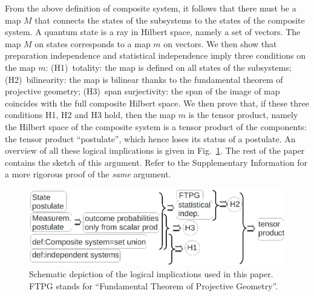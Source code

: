\documentclass[aps,prl,amsmath,amssymb,twocolumn,nofootinbib]{revtex4}
\theoremstyle{plain}
\theoremstyle{definition}
\theoremstyle{remark}
\begin{document}
	From the above definition of composite system, it follows that there
	must be a map $M$ that connects the states of the subsystems to the
	states of the composite system. A quantum state is a ray in Hilbert
	space, namely a set of vectors. The map $M$ on states corresponds to a
	map $m$ on vectors. We then show that preparation independence and
	statistical independence imply three conditions on the map $m$:
	(H1)~totality: the map is defined on all states of the subsystems;
	(H2)~bilinearity: the map is bilinear thanks to the fundamental
	theorem of projective geometry; (H3)~span surjectivity: the span of
	the image of map coincides with the full composite Hilbert space.  We
	then prove that, if these three conditions H1, H2 and H3 hold, then
	the map $m$ is the tensor product, namely the Hilbert space of the
	composite system is a tensor product of the components: the tensor
	product ``postulate'', which hence loses its status of a postulate. An
	overview of all these logical implications is given in
	Fig.~\ref{f:fig}. The rest of the paper contains the sketch of this
	argument. Refer to the Supplementary Information for a more rigorous
	proof of the \emph{same} argument.
	
	\begin{figure}[ht]
		\includegraphics[width=\linewidth, trim={0.2in 5.8in 2.5in 0.1in}, clip=true]{fig.eps}
		\caption{Schematic depiction of the logical implications used
			in this paper. FTPG stands for ``Fundamental Theorem of Projective Geometry''.  \label{f:fig}}\end{figure}
	
\end{document}
